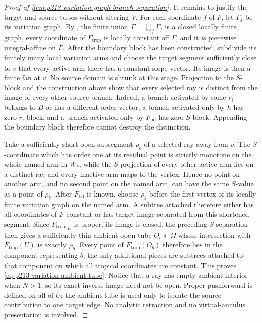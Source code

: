 \begin{proof}[Proof of
\cref{lem:p213-variation-graph-branch-separation}]
It remains to justify the target and source tubes without altering $V$.
For each coordinate
$f$ of $F$, let $\Gamma_f$ be its variation graph.  By
\cite[§§4.5.21.1--4.5.21.2]{Ducros24CurveStructure}, the finite
union $\Gamma=\bigcup_f\Gamma_f$ is a closed locally finite graph, every
coordinate of $F_{\mathrm{trop}}$ is locally constant off $\Gamma$, and
it is piecewise integral-affine on $\Gamma$.  After the boundary block has
been constructed, subdivide its finitely many local variation arms and
choose the target segment sufficiently close to $v$ that every active arm
there has a constant slope vector.  Its image is then a finite fan at
$v$.  No source domain is shrunk at this stage.  Projection to the
$S$-block and the construction above show that every selected ray is
distinct from the image of every other source branch.  Indeed, a branch
activated by some $r_i$ belongs to $B$ or has a different order vector, a
branch activated only by $h$ has zero $r_i$-block, and a branch activated
only by $F_{\mathrm{bd}}$ has zero $S$-block.  Appending the boundary block
therefore cannot destroy the distinction.

Take a sufficiently short open subsegment $\rho_b$ of a selected ray away
from $v$.  The $S$-coordinate which has order one at its residual point is
strictly monotone on the whole named arm in $W_*$, while the $S$-projection
of every other active arm lies on a distinct ray and every inactive arm
maps to the vertex.  Hence no point on another arm, and no second point on
the named arm, can have the same $S$-value as a point of $\rho_b$.
After $F_{\mathrm{bd}}$ is known, choose $\rho_b$ before the first vertex
of its locally finite variation graph on the named arm.  A subtree attached
therefore either has all coordinates of $F$ constant or has target image
separated from this shortened segment.  Since $F_{\mathrm{trop}}|_U$ is
proper, its image is closed; the preceding $S$-separation then gives a
sufficiently thin ambient open tube $O_b\Subset\Omega$ whose intersection
with $F_{\mathrm{trop}}(U)$ is exactly $\rho_b$.  Every point of
$F_{\mathrm{trop}}^{-1}(O_b)$ therefore lies in the component representing
$b$;
the only additional pieces are subtrees attached to that component on
which all tropical coordinates are constant.  This proves
\eqref{eq:p213-variation-ambient-tube}.  Notice that a ray has empty
ambient interior when $N>1$, so its exact inverse image need not be open.
Proper pushforward is defined on all of $U$; the ambient tube is used only
to isolate the source contribution to one target edge.  No analytic
retraction and no virtual-annulus presentation is involved.
\end{proof}

